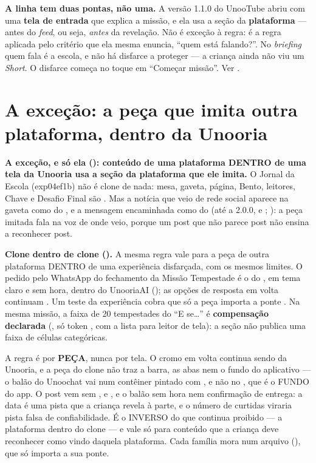 \begin{nota}
\textbf{A linha tem duas pontas, não uma.} A versão 1.1.0 do UnooTube abriu com uma
\textbf{tela de entrada} que explica a missão, e ela usa a seção da
\textbf{plataforma} --- antes do \emph{feed}, ou seja, \emph{antes} da revelação.
Não é exceção à regra: é a regra aplicada pelo critério que ela mesma enuncia,
\enquote{quem está falando?}. No \emph{briefing} quem fala é a escola, e não há
disfarce a proteger --- a criança ainda não viu um \emph{Short}. O disfarce começa
no toque em \enquote{Começar missão}. Ver .
\end{nota}

\section{A exceção: a peça que imita outra plataforma, dentro da Unooria}
\label{sec:ds-peca-imitada}

\begin{regra}
\textbf{A exceção, e só ela (): conteúdo de uma plataforma DENTRO
de uma tela da Unooria usa a seção da plataforma que ele imita.} O Jornal da
Escola (exp04ef1b) não é clone de nada: mesa, gaveta, página, Bento, leitores,
Chave e Desafio Final são . Mas a notícia que veio de rede social
aparece na gaveta como  do , e a mensagem
encaminhada como  do  (até a 2.0.0,
 e ; ): a peça imitada fala
na voz de onde veio, porque um post que não parece post não ensina a reconhecer
post.
\end{regra}

\textbf{Clone dentro de clone ().} A mesma regra vale para a
peça de outra plataforma DENTRO de uma experiência disfarçada, com os mesmos
limites. O pedido pelo WhatsApp do fechamento da Missão Tempestade é o
 do , em tema claro e sem hora, dentro do
UnooriaAI (); as opções
de resposta em volta continuam . Um teste da experiência cobra que
só a peça importa a ponte . Na mesma missão, a faixa de
20 tempestades do \enquote{E se\ldots} é \textbf{compensação declarada}
(, só token , com a lista para leitor de
tela): a seção não publica uma faixa de células categóricas.

A regra é por \textbf{PEÇA}, nunca por tela. O cromo em volta continua sendo da
Unooria, e a peça do clone não traz a barra, as abas nem o fundo do aplicativo
--- o balão do Unoochat vai num contêiner pintado com
, e não no , que é o FUNDO do app.
O post vem sem ,  e , e o balão sem hora nem
confirmação de entrega: a data é uma pista que a criança revela à parte, e o
número de curtidas viraria pista falsa de confiabilidade. É o INVERSO do que
continua proibido --- a plataforma dentro do clone --- e vale só para conteúdo que
a criança deve reconhecer como vindo daquela plataforma. Cada família mora num
arquivo (), que só importa a sua ponte.


